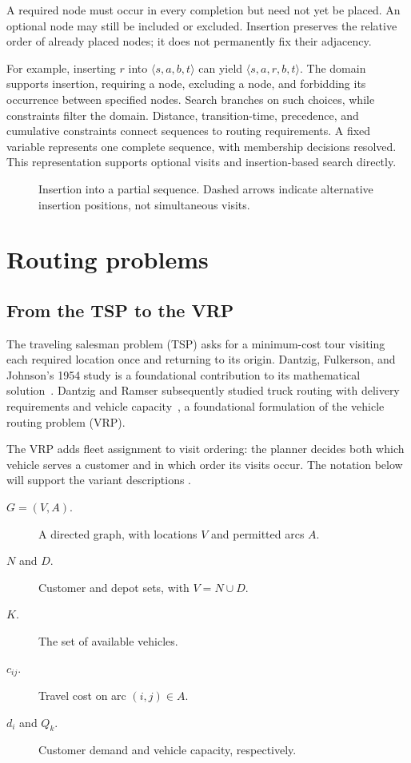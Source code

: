 A required node must occur in every completion but need not yet be placed.
An optional node may still be included or excluded. Insertion preserves the
relative order of already placed nodes; it does not permanently fix their
adjacency.

For example, inserting $r$ into $\langle s,a,b,t\rangle$ can yield
$\langle s,a,r,b,t\rangle$. The domain supports insertion, requiring a node,
excluding a node, and forbidding its occurrence between specified nodes.
Search branches on such choices, while constraints filter the domain.
Distance, transition-time, precedence, and cumulative constraints connect
sequences to routing requirements. A fixed variable represents one complete
sequence, with membership decisions resolved. This representation supports
optional visits and insertion-based search directly.

\begin{figure}[htbp]
 \centering
 
 \caption{Insertion into a partial sequence. Dashed arrows indicate alternative
 insertion positions, not simultaneous visits.}
 \label{fig:sequence-insertion}
\end{figure}

\section{Routing problems}\label{sec:routing-background}

\subsection{From the TSP to the VRP}

The traveling salesman problem (TSP) asks for a minimum-cost tour visiting
each required location once and returning to its origin. Dantzig, Fulkerson,
and Johnson's 1954 study is a foundational contribution to its mathematical
solution~\cite{dantzig1954tsp}. Dantzig and Ramser subsequently studied truck
routing with delivery requirements and vehicle capacity~\cite{dantzig1959truck},
a foundational formulation of the vehicle routing problem (VRP).

The VRP adds fleet assignment to visit ordering: the planner decides both
which vehicle serves a customer and in which order its visits occur.
The notation below will support the variant descriptions
\cite{toth2014vehicle}.

\begin{description}
 \item[$G=(V,A)$.] A directed graph, with locations $V$ and permitted arcs $A$.
 \item[$N$ and $D$.] Customer and depot sets, with $V=N\cup D$.
 \item[$K$.] The set of available vehicles.
 \item[$c_{ij}$.] Travel cost on arc $(i,j)\in A$.
 \item[$d_i$ and $Q_k$.] Customer demand and vehicle capacity, respectively.
\end{description}

